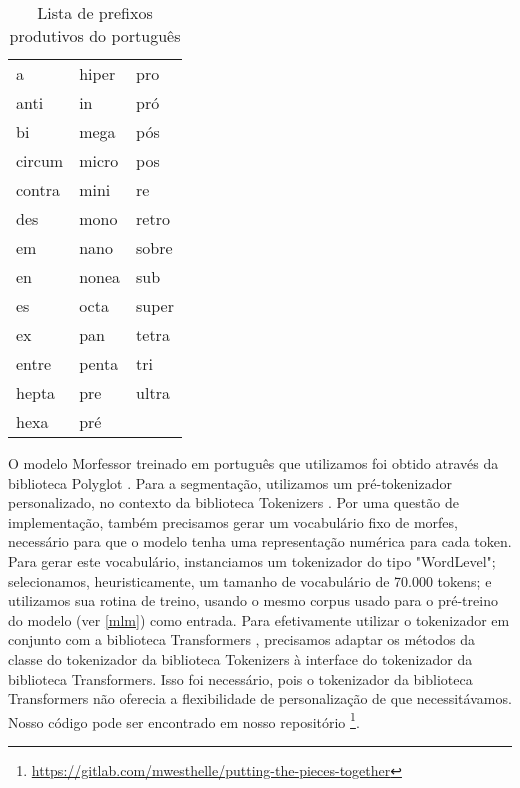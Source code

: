 \documentclass[cic,tc]{iiufrgs}
\begin{document}
\begin{table}[]
    \caption{Lista de prefixos produtivos do português}
    \centering
        \begin{tabular}{lll}
        \hline
        a      & hiper & pro   \\
        anti   & in    & pró   \\
        bi     & mega  & pós   \\
        circum & micro & pos   \\
        contra & mini  & re    \\
        des    & mono  & retro \\
        em     & nano  & sobre \\
        en     & nonea & sub   \\
        es     & octa  & super \\
        ex     & pan   & tetra \\
        entre  & penta & tri   \\
        hepta  & pre   & ultra \\
        hexa   & pré   &       \\ \hline
        \end{tabular}
    \label{tbl:prefixos}
\end{table}

\begin{sloppypar}
O modelo Morfessor treinado em português que utilizamos foi obtido através da biblioteca Polyglot \cite{Al-Rfou2020}. Para a segmentação, utilizamos um pré-tokenizador personalizado, no contexto da biblioteca Tokenizers \cite{anthony_moi_2022_5862127}. Por uma questão de implementação, também precisamos gerar um vocabulário fixo de morfes, necessário para que o modelo tenha uma representação numérica para cada token. Para gerar este vocabulário,  instanciamos um tokenizador do tipo "WordLevel"; selecionamos, heuristicamente, um tamanho de vocabulário de 70.000 tokens; e utilizamos sua rotina de treino, usando o mesmo corpus usado para o pré-treino do modelo (ver \ref{mlm}) como entrada. Para efetivamente utilizar o tokenizador em conjunto com a biblioteca Transformers \cite{thomas_wolf_2021_5045610}, precisamos adaptar os métodos da classe do tokenizador da biblioteca Tokenizers à interface do tokenizador da biblioteca Transformers. Isso foi necessário, pois o tokenizador da biblioteca Transformers não oferecia a flexibilidade de personalização de que necessitávamos. Nosso código pode ser encontrado em nosso repositório \footnote{\url{https://gitlab.com/mwesthelle/putting-the-pieces-together}}.
\end{sloppypar}
\end{document}
